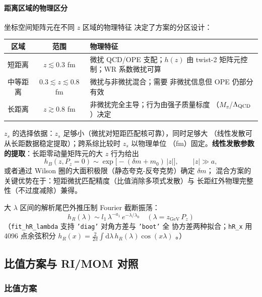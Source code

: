 \documentclass[11pt,a4paper]{ctexart}
\newcommand{\abs}[1]{\lvert #1\rvert}
\newcommand{\code}[1]{\texttt{#1}}
\begin{document}
\paragraph{距离区域的物理区分}坐标空间矩阵元在不同 $z$ 区域的物理特征
决定了方案的分区设计：
\begin{center}
\small
\begin{tabular}{c c l}
\toprule
\textbf{区域} & \textbf{范围} & \textbf{物理特征} \\
\midrule
短距离 & $z\lesssim0.3$ fm & 微扰 QCD/OPE 支配；$h(z)$ 由 twist-2
矩阵元控制；WR 系数微扰可算 \\
中等距离 & $0.3\lesssim z\lesssim0.8$ fm & 微扰与非微扰混合；需要
非微扰信息但 OPE 仍部分有效 \\
长距离 & $z\gtrsim0.8$ fm & 非微扰完全主导；行为由强子质量标度
（$M_\pi$/$\Lambda_{\rm QCD}$）决定 \\
\bottomrule
\end{tabular}
\end{center}
$z_s$ 的选择依据：$z_s$ 足够小（微扰对短距匹配核可靠），同时足够大
（线性发散可从长距数据稳定提取）；跨系综比较时 $z_s$ 以物理单位
（fm）固定。\textbf{线性发散参数的提取}：长距零动量矩阵元的大 $z$
行为给出
\begin{equation}\label{eq:dm-extraction}
h_B(z, P_z=0) \sim \exp\!\bigl[-(\delta m + m_0)\,\abs{z}\bigr],
\qquad \abs z \gg a,
\end{equation}
或者通过 Wilson 圈的大面积极限（静态夸克-反夸克势）确定 $\delta m$；
混合方案的关键优势在于：短距微扰匹配精度（比值消除多项式发散）与
长距红外物理完整性（不过度减除）兼得。

大 $\lambda$ 区间的解析尾巴外推压制 Fourier 截断振荡：
\begin{equation}
h_R(\lambda) \sim l_1\,\lambda^{-a_1}\,e^{-\lambda/\lambda_0}
\quad(\lambda = z_{\mathrm{GeV}}\,P_z)
\end{equation}
（\code{fit\_hR\_lambda} 支持 \code{'diag'} 对角方差与 \code{'boot'} 全
协方差两种拟合；\code{hR\_x} 用 4096 点余弦积分
$h_R(x)=\frac{2}{2\pi}\int \mathrm{d}\lambda\,h_R(\lambda)\cos(x\lambda)$
。）

\subsection{比值方案与 RI/MOM 对照}

\subsubsection{比值方案}
\end{document}
